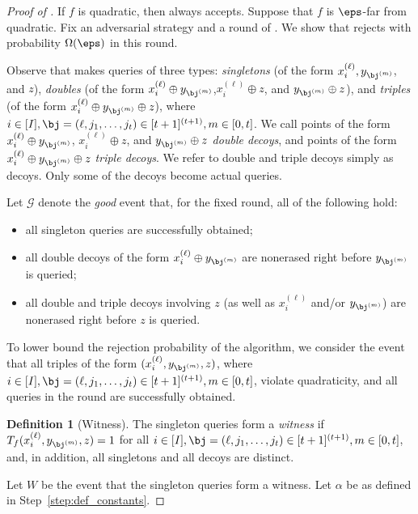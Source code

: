 \documentclass[11pt]{article}
\numberwithin{equation}{section}
\theoremstyle{definition}
\newtheorem{definition}[theorem]{Definition}
\theoremstyle{plain}
\begin{document}
\begin{proof}[Proof of ] 



If $f$ is quadratic, then  always accepts. Suppose that $f$ is $\eps$-far from quadratic. Fix an adversarial strategy and a round of . We show that  rejects with probability  $\Omega(\eps)$ in this round.  

 Observe that  makes queries of three types: {\em singletons} (of the form $x_i^{(\ell)},y_{\bj^{(m)}}$, and $z$), {\em doubles} (of the form $x_i^{(\ell)}\oplus y_{\bj^{(m)}}$,$x_i^{(\ell)} \oplus z$, and $y_{\bj^{(m)}}\oplus z$), and {\em triples} (of the form $x_i^{(\ell)}\oplus y_{\bj^{(m)}}\oplus z$), where $i \in [I], \bj = (\ell, j_1, \dots, j_t) \in [t+1]^{(t+1)}, m \in [0, t]$.  We call points of the form $x_i^{(\ell)}\oplus y_{\bj^{(m)}}$, $x_i^{(\ell)} \oplus z$, and $y_{\bj^{(m)}}\oplus z$ {\em double decoys}, and points of the form $x_i^{(\ell)}\oplus y_{\bj^{(m)}} \oplus z$ {\em triple decoys}. We refer to double and triple decoys simply as decoys. Only some of the decoys become actual queries. 


Let $\mathcal{G}$ denote the {\em good} event that, for the fixed round, all of the following hold:
\begin{itemize}
    \item all singleton queries are successfully obtained; 
    \item all double decoys of the form $x_i^{(\ell)} \oplus y_{\bj^{(m)}}$ are nonerased right before $y_{\bj^{(m)}}$ is queried;
    \item all double and triple decoys involving $z$ (as well as $x_i^{(\ell)}$ and/or $y_{\bj^{(m)}}$) are nonerased right before $z$ is queried.
\end{itemize}


To lower bound the rejection probability of the algorithm, we consider the event that all triples of the form  $(x_i^{(\ell)}, y_{\bj^{(m)}}, z)$, where $i \in [I], \bj = (\ell, j_1, \dots, j_t) \in [t+1]^{(t+1)}, m \in [0, t]$, violate quadraticity, and all queries in the round are successfully obtained. 
 \begin{definition}[Witness]
The singleton queries form a \emph{witness} if $T_f(x_i^{(\ell)},y_{\bj^{(m)}}, z) = 1$ for all $i \in [I], \bj = (\ell, j_1, \dots, j_t) \in [t+1]^{(t+1)}, m \in [0, t]$, and, in addition, all singletons and all decoys are distinct. 
 \end{definition}
 Let $W$ be the event that the singleton queries form a witness. Let $\alpha$ be as defined in Step~\ref{step:def_constants}. 


\end{proof}
\end{document}
